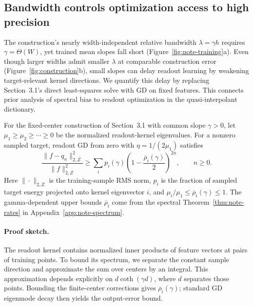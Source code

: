 \subsection{Bandwidth controls optimization access to high precision}
\label{sec:bandwidth-access}

The construction's nearly width-independent relative bandwidth $\lambda=\gamma h$ requires
$\gamma=\Theta(W)$, yet trained mean slopes fall short (Figure~\ref{fig:note-training}a).
Even though larger widths admit smaller $\lambda$ at comparable construction error
(Figure~\ref{fig:construction}b), small slopes can delay readout learning by weakening
target-relevant kernel directions. We quantify this delay by replacing
Section~3.1's direct least-squares solve with GD on fixed features.
This connects prior analysis of spectral bias
\citep{xu2020frequency,tancik2020fourier} to readout optimization
in the quasi-interpolant dictionary.

\begin{theorem}
\label{thm:note-output}
For the fixed-center construction of Section~3.1 with common slope
$\gamma>0$, let $\mu_1\ge\mu_2\ge\cdots\ge0$ be the normalized
readout-kernel eigenvalues. For a nonzero sampled target, readout GD from
zero with $\eta=1/(2\mu_1)$ satisfies
\begin{equation}
 \frac{\|f-q_n\|_{2,Z}^{2}}{\|f\|_{2,Z}^{2}}
 \ge\sum_i p_i(\gamma)
 \left(1-\frac{\overline\rho_i(\gamma)}2\right)^{2n},\qquad n\ge0.
 \label{eq:note-output-bound}
\end{equation}
Here $\|\cdot\|_{2,Z}$ is the training-sample RMS norm,
$p_i$ is the fraction of sampled target energy projected onto kernel
eigenvector $i$, and $\mu_i/\mu_1\le\overline\rho_i(\gamma)\le1$.
The gamma-dependent upper bounds $\overline\rho_i$ come from the spectral
Theorem~\ref{thm:note-rates} in Appendix~\ref{app:note-spectrum}.
\end{theorem}

\paragraph{Proof sketch.}
The readout kernel contains normalized inner products of feature vectors
at pairs of training points. To bound its spectrum, we separate the constant
sample direction and approximate the sum over centers by an integral.
This approximation depends explicitly on $d\coth(\gamma d)$,
where $d$ separates those points. Bounding the finite-center corrections
gives $\overline\rho_i(\gamma)$; standard GD eigenmode decay then yields
the output-error bound.

